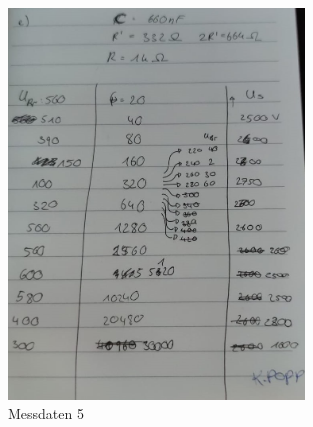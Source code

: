 \begin{figure}
  \centering
  \includegraphics[width=0.7\textwidth]{M_e).jpeg}
  \caption{Messdaten 5}
  \label{fig:M5}
\end{figure}
  